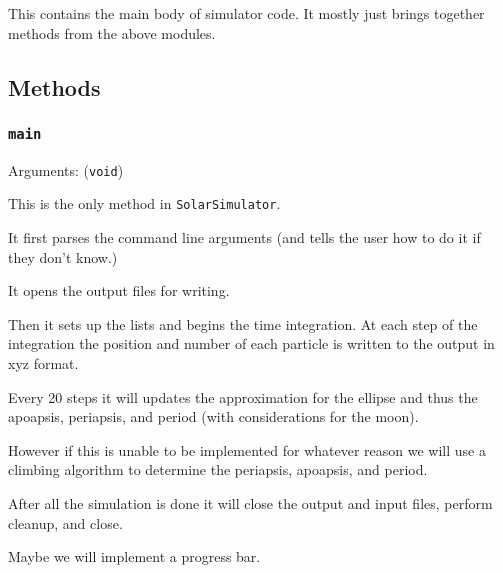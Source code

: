 \documentclass[a4paper, 11pt, british, left=1in, right=1in, top=0.3in, bottom=1in]{article}
\begin{document}
	This contains the main body of simulator code. It mostly just brings together methods from the above modules. 
	
	\subsection{Methods}
	
	\subsubsection{\texttt{main}}
	
	Arguments: (\texttt{void})
	
	This is the only method in \texttt{SolarSimulator}.
	
	It first parses the command line arguments (and tells the user how to do it if they don't know.) 
	
	It opens the output files for writing.
	
	Then it sets up the lists and begins the time integration. At each step of the integration the position and number of each particle is written to the output in xyz format. 
	
	Every 20 steps it will updates the approximation for the ellipse and thus the apoapsis, periapsis, and period (with considerations for the moon). 
	
	However if this is unable to be implemented for whatever reason we will use a climbing algorithm to determine the periapsis, apoapsis, and period. 
	
	After all the simulation is done it will close the output and input files, perform cleanup, and close.
	
	Maybe we will implement a progress bar. 
	
\end{document}

